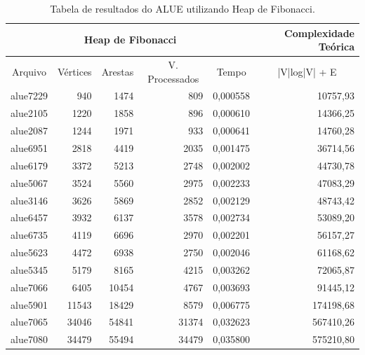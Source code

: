 \documentclass[
	12pt,				%
	oneside,			%
	a4paper,			%
	english,			%
	french,				%
	spanish,			%
	brazil,				%
	]{abntex2}
\begin{document}
\begin{table}[H]
  \centering    
  \begin{tabular}{|c|r|r|r|r|r|}
    \toprule
    \multicolumn{5}{|c|}{\cellcolor{gray!25}\textbf{Heap de Fibonacci}} & \cellcolor{gray!25}\textbf{Complexidade Teórica}\\
    \midrule
    \multicolumn{1}{|c|}{\cellcolor{gray!10}Arquivo} & \multicolumn{1}{|c|}{\cellcolor{gray!10}Vértices} & \multicolumn{1}{|c|}{\cellcolor{gray!10}Arestas} & \multicolumn{1}{|c|}{\cellcolor{gray!10}V. Processados} & \multicolumn{1}{|c|}{\cellcolor{gray!10}Tempo} & \multicolumn{1}{|c|}{\cellcolor{gray!10}|V|log|V| + E}\\
    \hline
    alue7229	&	940	&	1474	&	809	&	0,000558	&	10757,93	\\
    \hline
    alue2105	&	1220	&	1858	&	896	&	0,000610	&	14366,25	\\
    \hline
    alue2087	&	1244	&	1971	&	933	&	0,000641	&	14760,28	\\
    \hline
    alue6951	&	2818	&	4419	&	2035	&	0,001475	&	36714,56	\\
    \hline
    alue6179	&	3372	&	5213	&	2748	&	0,002002	&	44730,78	\\
    \hline
    alue5067	&	3524	&	5560	&	2975	&	0,002233	&	47083,29	\\
    \hline
    alue3146	&	3626	&	5869	&	2852	&	0,002129	&	48743,42	\\
    \hline
    alue6457	&	3932	&	6137	&	3578	&	0,002734	&	53089,20	\\
    \hline
    alue6735	&	4119	&	6696	&	2970	&	0,002201	&	56157,27	\\
    \hline
    alue5623	&	4472	&	6938	&	2750	&	0,002046	&	61168,62	\\
    \hline
    alue5345	&	5179	&	8165	&	4215	&	0,003262	&	72065,87	\\
    \hline
    alue7066	&	6405	&	10454	&	4767	&	0,003693	&	91445,12	\\
    \hline
    alue5901	&	11543	&	18429	&	8579	&	0,006775	&	174198,68	\\
    \hline
    alue7065	&	34046	&	54841	&	31374	&	0,032623	&	567410,26	\\
    \hline
    alue7080	&	34479	&	55494	&	34479	&	0,035800	&	575210,80	\\
    \hline
  \end{tabular}
  \caption{Tabela de resultados do ALUE utilizando Heap de Fibonacci.}  
  \label{tab:AlueHeap}
\end{table}
\end{document}
